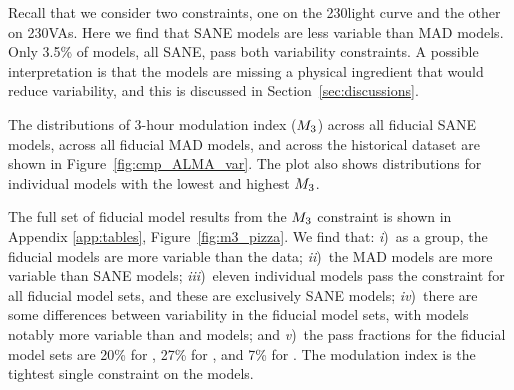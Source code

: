 Recall that we consider two constraints, one on the 230\GHz light curve and the other on 230\GHz VAs.  Here we find that SANE models are less variable than MAD models. Only 3.5\% of models, all SANE, pass both variability constraints.  A possible interpretation is that the models are missing a physical ingredient that would reduce variability, and this is discussed in Section~\ref{sec:discussions}.


The distributions of 3-hour modulation index ($M_{3}$) across all fiducial SANE models, across all fiducial MAD models, and across the historical dataset are shown in Figure~\ref{fig:cmp_ALMA_var}.
The plot also shows distributions for individual models with the lowest and highest $M_{3}$.

The full set of fiducial model results from the $M_{3}$ constraint is shown in Appendix \ref{app:tables}, Figure~\ref{fig:m3_pizza}.
We find that:
\emph{i})~as a group, the fiducial models are more variable than the data;
\emph{ii})~the MAD models are more variable than SANE models;
\emph{iii})~eleven individual models  pass the constraint for all fiducial model sets, and these are exclusively SANE models;
\emph{iv})~there are some differences between variability in the fiducial model sets, with \hamr models notably more variable than \kharma and \bhac models; and
\emph{v})~the pass fractions for the fiducial model sets are 20\% for \kharma, 27\% for \bhac, and 7\% for \hamr.
The modulation index is the tightest single constraint on the models.


